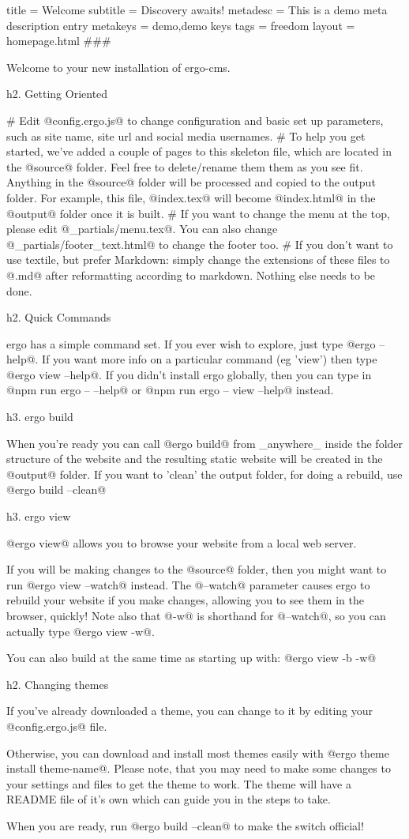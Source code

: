 title = Welcome
subtitle = Discovery awaits!
metadesc = This is a demo meta description entry
metakeys = demo,demo keys
tags = freedom
layout = homepage.html
###

Welcome to your new installation of ergo-cms.


h2. Getting Oriented

# Edit @config.ergo.js@ to change configuration and basic set up parameters, such as site name, site url and social media usernames.
# To help you get started, we've added a couple of pages to this skeleton file, which are located in the @source@ folder. Feel free to delete/rename them them as you see fit. 
Anything in the @source@ folder will be processed and copied to the output folder. For example, this file, @index.tex@ will become @index.html@ in the @output@ folder once it is built.
# If you want to change the menu at the top, please edit @_partials/menu.tex@. You can also change @_partials/footer_text.html@ to change the footer too.
# If you don't want to use textile, but prefer Markdown: simply change the extensions of these files to @.md@ after reformatting according to markdown. Nothing else needs to be done. 


h2. Quick Commands

ergo has a simple command set. If you ever wish to explore, just type @ergo --help@. If you want more info on a particular command (eg 'view') then type @ergo view --help@. If you didn't install ergo globally, then you can type in @npm run ergo -- --help@ or @npm run ergo -- view --help@ instead.

h3. ergo build

When you're ready you can call @ergo build@ from _anywhere_ inside the folder structure of the website and the resulting static website will be created in the @output@ folder. If you want to 'clean' the output folder, for doing a rebuild, use @ergo build --clean@


h3. ergo view

@ergo view@ allows you to browse your website from a local web server.

If you will be making changes to the @source@ folder, then you might want to run @ergo view --watch@ instead. The @--watch@ parameter causes ergo to rebuild your website if you make changes, allowing you to see them in the browser, quickly! Note also that @-w@ is shorthand for @--watch@, so you can actually type @ergo view -w@. 

You can also build at the same time as starting up with: @ergo view -b -w@

h2. Changing themes

If you've already downloaded a theme, you can change to it by editing your @config.ergo.js@ file. 

Otherwise, you can download and install most themes easily with @ergo theme install theme-name@. Please note, that you may need to make some changes to your settings and files to get the theme to work. The theme will have a README file of it's own which can guide you in the steps to take. 

When you are ready, run @ergo build --clean@ to make the switch official!
